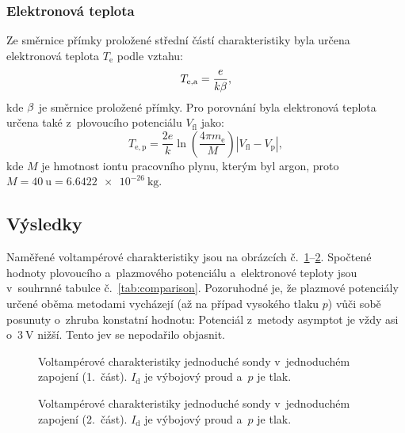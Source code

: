\documentclass{protokol}
\newcommand\elemcharge{e}
\newcommand\boltzmann{k}
\newcommand\masselec{m_\mathrm{e}}
\newcommand\pres{p}
\newcommand\idisch{I_\mathrm{d}}
\newcommand\flpot{V_\mathrm{fl}}
\newcommand\plpot{V_\mathrm{p}}
\newcommand\tempelec{T_\mathrm{e}}
\newcommand\tempeleca{T_\mathrm{e,a}}
\newcommand\tempelecp{T_\mathrm{e,p}}
\newcommand\massion{M}
\begin{document}
\subsubsection{Elektronová teplota}
Ze směrnice přímky proložené střední částí charakteristiky byla určena
elektronová teplota $\tempelec$ podle vztahu:
\begin{equation}
	\label{eq:tempeleca}
	\tempeleca = \frac{\elemcharge}{\boltzmann \slopeb},
\end{equation}
kde $\beta$ je směrnice proložené přímky.
%
Pro porovnání byla elektronová teplota určena také z~plovoucího potenciálu
$\flpot$ jako:
\begin{equation}
	\label{eq:tempelecp}
	\tempelecp = \frac{2\elemcharge}{\boltzmann}
		\ln\left(\frac{4\pi\masselec}{\massion}\right)
		|\flpot - \plpot|,
\end{equation}
kde $\massion$ je hmotnost iontu pracovního plynu, kterým byl argon,
proto $\massion = \SI{40}{\atomicmassunit} = \SI{6.6422e-26}{\kilogram}$.

\subsection{Výsledky}
\label{results-simple}
Naměřené voltampérové charakteristiky jsou na obrázcích
č.~\ref{fig:simple1-vac-1}--\ref{fig:simple1-vac-2}.
Spočtené hodnoty plovoucího a~plaz\-mo\-vého potenciálu a~elektronové teploty
jsou v~souhrnné tabulce č.~\ref{tab:comparison}.
Pozoruhodné je, že plazmové potenciály určené oběma metodami vycházejí
(až na případ vysokého tlaku $\pres$) vůči sobě posunuty o~zhruba konstatní
hodnotu:
Potenciál z~metody asymptot je vždy asi o~$\SI{3}{\volt}$ nižší.
Tento jev se nepodařilo objasnit.

\begin{figure}[p]
	\centering
	
	
	\par\smallskip
	
	
	\par\smallskip
	
	
	\par\smallskip
	
	
	\caption{Voltampérové charakteristiky jednoduché sondy
		v~jednoduchém zapojení (1.~část).
		$\idisch$ je výbojový proud a~$\pres$ je tlak.}
	\label{fig:simple1-vac-1}
\end{figure}
\begin{figure}[p]
	\centering
	
	
	\par\smallskip
	
	
	\par\smallskip
	
	
	\caption{Voltampérové charakteristiky jednoduché sondy
		v~jednoduchém zapojení (2.~část).
		$\idisch$ je výbojový proud a~$\pres$ je tlak.}
	\label{fig:simple1-vac-2}
\end{figure}
\end{document}
